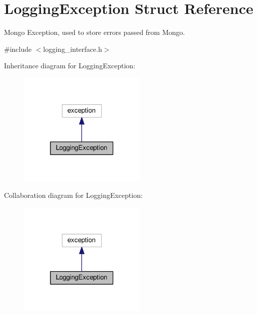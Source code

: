 \hypertarget{structLoggingException}{}\section{Logging\+Exception Struct Reference}
\label{structLoggingException}


Mongo Exception, used to store errors passed from Mongo.  




{\ttfamily \#include $<$logging\+\_\+interface.\+h$>$}



Inheritance diagram for Logging\+Exception\+:
\nopagebreak
\begin{figure}[H]
\begin{center}
\leavevmode
\includegraphics[width=174pt]{structLoggingException__inherit__graph}
\end{center}
\end{figure}


Collaboration diagram for Logging\+Exception\+:
\nopagebreak
\begin{figure}[H]
\begin{center}
\leavevmode
\includegraphics[width=174pt]{structLoggingException__coll__graph}
\end{center}
\end{figure}
